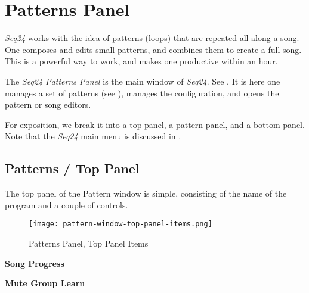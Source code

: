 %
%
%

\section{Patterns Panel}
\label{sec:seq24_patterns_panel}

   \textsl{Seq24} works with the idea of patterns (loops) that are repeated
   all along a song.  One composes and edits small patterns, and combines
   them to create a full song.  This is a powerful way to work, and makes
   one productive within an hour.

   The \textsl{Seq24 Patterns Panel} is the main window of \textsl{Seq24}.
   See .
   It is here one manages a set of patterns
   (see ),
   manages the configuration, and opens the pattern or song editors.

   For exposition, we break it into a top panel, a pattern panel, and a
   bottom panel.  Note that the \textsl{Seq24} main menu is discussed in
   .

\subsection{Patterns / Top Panel}
\label{subsec:seq24_patterns_panel_top}

   The top panel of the Pattern window is simple, consisting of the name of
   the program and a couple of controls.

\begin{figure}[H]
   \centering 
   \texttt{[image: pattern-window-top-panel-items.png]}
   \caption{Patterns Panel, Top Panel Items}
   \label{fig:pattern_window_top_panel_items}
\end{figure}

   \begin{enumber}
      \item \textbf{Song Progress}
      \item \textbf{Mute Group Learn}
   \end{enumber}

